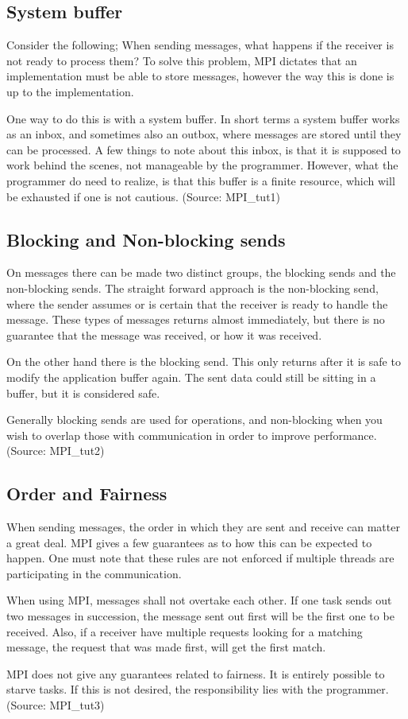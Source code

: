 \subsection{System buffer}
Consider the following; When sending messages, what happens if the receiver is not ready to process them? To solve this problem, MPI dictates that an implementation must be able to store messages, however the way this is done is up to the implementation.

One way to do this is with a system buffer. In short terms a system buffer works as an inbox, and sometimes also an outbox, where messages are stored until they can be processed. A few things to note about this inbox, is that it is supposed to work behind the scenes, not manageable by the programmer. However, what the programmer do need to realize, is that this buffer is a finite resource, which will be exhausted if one is not cautious.
(Source: MPI\_tut1)

\subsection{Blocking and Non-blocking sends}
On messages there can be made two distinct groups, the blocking sends and the non-blocking sends. The straight forward approach is the non-blocking send, where the sender assumes or is certain that the receiver is ready to handle the message. These types of messages returns almost immediately, but there is no guarantee that the message was received, or how it was received.

On the other hand there is the blocking send. This only returns after it is safe to modify the application buffer again. The sent data could still be sitting in a buffer, but it is considered safe.

Generally blocking sends are used for operations, and non-blocking when you wish to overlap those with communication in order to improve performance.
(Source: MPI\_tut2)

\subsection{Order and Fairness}
When sending messages, the order in which they are sent and receive can matter a great deal. MPI gives a few guarantees as to how this can be expected to happen. One must note that these rules are not enforced if multiple threads are participating in the communication.

When using MPI, messages shall not overtake each other. If one task sends out two messages in succession, the message sent out first will be the first one to be received. Also, if a receiver have multiple requests looking for a matching message, the request that was made first, will get the first match.

MPI does not give any guarantees related to fairness. It is entirely possible to starve tasks. If this is not desired, the responsibility lies with the programmer.
(Source: MPI\_tut3)